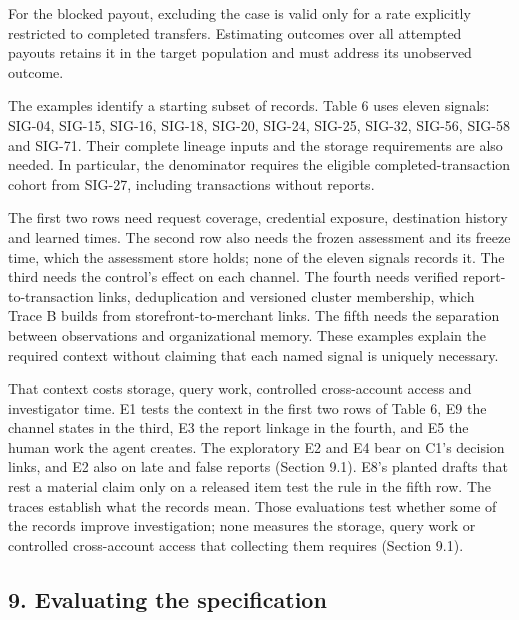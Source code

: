 \documentclass[
  11pt,
]{article}
\begin{document}
For the blocked payout, excluding the case is valid only for a rate
explicitly restricted to completed transfers. Estimating outcomes over
all attempted payouts retains it in the target population and must
address its unobserved outcome.

The examples identify a starting subset of records. Table 6 uses eleven
signals: \mbox{SIG-04}, \mbox{SIG-15}, \mbox{SIG-16}, \mbox{SIG-18},
\mbox{SIG-20}, \mbox{SIG-24}, \mbox{SIG-25}, \mbox{SIG-32},
\mbox{SIG-56}, \mbox{SIG-58} and \mbox{SIG-71}. Their complete lineage
inputs and the storage requirements are also needed. In particular, the
denominator requires the eligible completed-transaction cohort from
\mbox{SIG-27}, including transactions without reports.

The first two rows need request coverage, credential exposure,
destination history and learned times. The second row also needs the
frozen assessment and its freeze time, which the assessment store holds;
none of the eleven signals records it. The third needs the control's
effect on each channel. The fourth needs verified report-to-transaction
links, deduplication and versioned cluster membership, which Trace B
builds from storefront-to-merchant links. The fifth needs the separation
between observations and organizational memory. These examples explain
the required context without claiming that each named signal is uniquely
necessary.

That context costs storage, query work, controlled cross-account access
and investigator time. E1 tests the context in the first two rows of
Table 6, E9 the channel states in the third, E3 the report linkage in
the fourth, and E5 the human work the agent creates. The exploratory E2
and E4 bear on C1's decision links, and E2 also on late and false
reports (Section 9.1). E8's planted drafts that rest a material claim
only on a released item test the rule in the fifth row. The traces
establish what the records mean. Those evaluations test whether some of
the records improve investigation; none measures the storage, query work
or controlled cross-account access that collecting them requires
(Section 9.1).

\FloatBarrier

\hypertarget{evaluating-the-specification}{%
\subsection{9. Evaluating the
specification}\label{evaluating-the-specification}}
\end{document}
